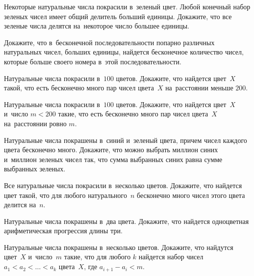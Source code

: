 


\begin{problems}

\item
Некоторые натуральные числа покрасили в~зеленый цвет.
Любой конечный набор зеленых чисел имеет общий делитель больший единицы.
Докажите, что все зеленые числа делятся на~некоторое число большее единицы.

\item
Докажите, что в~бесконечной последовательности попарно различных натуральных
чисел, больших единицы, найдется бесконечное количество чисел, которые больше
своего номера в~этой последовательности.

\item
Натуральные числа покрасили в~$100$ цветов.
Докажите, что найдется цвет~$X$ такой, что есть бесконечно много пар чисел
цвета~$X$ на~расстоянии меньше $200$.

\item
Натуральные числа покрасили в~$100$ цветов.
Докажите, что найдется цвет~$X$ и~число $m < 200$ такие, что есть бесконечно
много пар чисел цвета~$X$ на~расстоянии ровно $m$.

\item
Натуральные числа покрашены в~синий и~зеленый цвета, причем чисел каждого цвета
бесконечно много.
Докажите, что можно выбрать миллион синих и~миллион зеленых чисел так, что
сумма выбранных синих равна сумме выбранных зеленых.

\item
Все натуральные числа покрасили в~несколько цветов.
Докажите, что найдется цвет такой, что для любого натурального~$n$ бесконечно
много чисел этого цвета делится на~$n$.

\item
Натуральные числа покрашены в~два цвета.
Докажите, что найдется одноцветная арифметическая прогрессия длины три.

\item
Натуральные числа покрашены в~несколько цветов.
Докажите, что найдутся цвет~$X$ и~число~$m$ такие, что для любого $k$ найдется
набор чисел $a_1 < a_2 < \ldots < a_k$ цвета~$X$, где $a_{i + 1} - a_i < m$.

\end{problems}

